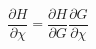 \begin{equation}  \frac{\partial
H} {\partial \chi} = \frac{\partial H} {\partial G} \frac{\partial G}
{\partial
\chi}  \end{equation} 
